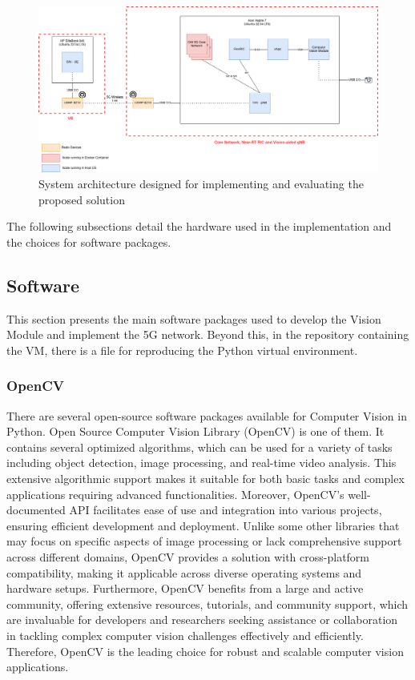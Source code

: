 \begin{figure}[H]
    \centering
    \includegraphics[width=0.7\linewidth]{figures/System Arch.drawio}
    \caption[System architecture designed for implementing and evaluating the proposed solution]{System architecture designed for implementing and evaluating the proposed solution}
    \label{fig:design_arch}
\end{figure}

The following subsections detail the hardware used in the implementation and the choices for software packages.


\subsection{Software}\label{subsec:software}
This section presents the main software packages used to develop the Vision Module and implement the 5G network.
Beyond this, in the repository containing the VM, there is a file for reproducing the Python virtual environment.

\subsubsection{OpenCV}
There are several open-source software packages available for Computer Vision in Python.
Open Source Computer Vision Library (OpenCV) is one of them.
It contains several optimized algorithms, which can be used for a variety of tasks including object detection, image processing, and real-time video analysis.
This extensive algorithmic support makes it suitable for both basic tasks and complex applications requiring advanced functionalities.
Moreover, OpenCV's well-documented API facilitates ease of use and integration into various projects, ensuring efficient development and deployment.
Unlike some other libraries that may focus on specific aspects of image processing or lack comprehensive support across different domains, OpenCV provides a solution with cross-platform compatibility, making it applicable across diverse operating systems and hardware setups.
Furthermore, OpenCV benefits from a large and active community, offering extensive resources, tutorials, and community support, which are invaluable for developers and researchers seeking assistance or collaboration in tackling complex computer vision challenges effectively and efficiently.
Therefore, OpenCV is the leading choice for robust and scalable computer vision applications.




